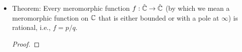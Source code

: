 \documentclass[../notes.tex]{subfiles}
\begin{document}
\begin{itemize}
\begin{equation*}
        \res_p(f) = 0
    \end{equation*}
    \begin{proof}
        This goes back to the proposition associated with Figure \ref{fig:contLoopInteg}. If the residue is zero, then the closed loop integral is zero, so by homotopy and this proposition, $f$ has a primitive on the disk. And if it has a primitive, then it's holomorphic on $D$ with no pole and therefore the residue must be is zero.
    \end{proof}
    \item Theorem: Every meromorphic function $f:\hat{\mathbb{C}}\to\hat{\mathbb{C}}$ (by which we mean a meromorphic function on $\mathbb{C}$ that is either bounded or with a pole at $\infty$) is rational, i.e., $f=p/q$.
    \begin{proof}
            
            



\end{proof}
\end{itemize}
\end{document}

